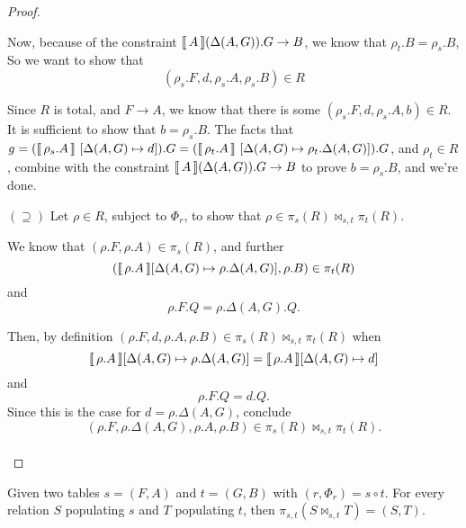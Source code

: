 \begin{proof}
\begin{enumerate}[align=left]
  \end{enumerate}

  Now, because of the constraint $\llbracket\,A\,\rrbracket(\Delta(A,G)).G \to B$, we
  know that $\rho_t.B = \rho_s.B$, So we want to show
  that \[(\rho_s.F, d, \rho_s.A, \rho_s.B) \in R\]

  Since $R$ is total, and $F \longrightarrow A$, we know that there is
  some $(\rho_s.F, d, \rho_s.A, b) \in R$. It is sufficient to show
  that $b = \rho_s.B$.  The facts that
  $g = (\llbracket\,\rho_s.A\,\rrbracket~[\Delta(A,G) \mapsto d]).G =
  (\llbracket\,\rho_t.A\,\rrbracket~[\Delta(A,G) \mapsto \rho_t.\Delta(A,G)]).G$, and
  $\rho_t \in R$, combine with the constraint
  $\llbracket\,A\,\rrbracket(\Delta(A,G)).G \to B$ to prove $b = \rho_s.B$, and we're
  done. \hfill \checkmark

\item[$(\supseteq)$] Let $\rho \in R$, subject to $\Phi_r$, to show
  that $\rho \in \pi_s(R) \bowtie_{s,t} \pi_t(R)$.

  We know that $(\rho.F, \rho.A) \in \pi_s(R)$, and further
  \[(\llbracket\,\rho.A\,\rrbracket[\Delta(A,G) \mapsto \rho.\Delta(A,G)],\rho.B) \in
    \pi_t(R)\]
  and \[\rho.F.Q = \rho.\Delta(A,G).Q.\]

  Then, by definition
  $(\rho.F, d, \rho.A, \rho.B) \in \pi_s(R) \bowtie_{s,t} \pi_t(R)$ when
  \[\llbracket\,\rho.A\,\rrbracket[\Delta(A,G) \mapsto \rho.\Delta(A,G)]
    = \llbracket\,\rho.A\,\rrbracket[\Delta(A,G) \mapsto d]\] and \[\rho.F.Q = d.Q.\]
  Since this is the case for $d = \rho.\Delta(A,G)$, conclude
  \[(\rho.F, \rho.\Delta(A,G), \rho.A, \rho.B) \in \pi_s(R)
    \bowtie_{s,t} \pi_t(R).\]
  \mbox{} \hfill \checkmark\\\mbox{}
\end{proof}

\begin{proposition}
  \label{prop:proj-join}
  Given two tables $s = (F,A)$ and $t = (G,B)$ with
  $(r, \Phi_r) = s \circ t$. For every relation $S$ populating $s$ and
  $T$ populating $t$, then $\pi_{s,t}(S \bowtie_{s,t} T) = (S,T)$.
\end{proposition}

